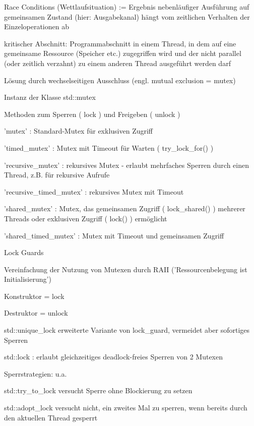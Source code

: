 \documentclass[10pt]{article}
\begin{document}
\begin{itemize*}
  \item Race Conditions (Wettlaufsituation) := Ergebnis nebenläufiger Ausführung auf gemeinsamen Zustand (hier: Ausgabekanal) hängt vom zeitlichen Verhalten der Einzeloperationen ab
  \item kritischer Abschnitt: Programmabschnitt in einem Thread, in dem auf eine gemeinsame Ressource (Speicher etc.) zugegriffen wird und der nicht parallel (oder zeitlich verzahnt) zu einem anderen Thread ausgeführt werden darf
  \item Lösung durch wechselseitigen Ausschluss (engl. mutual exclusion = mutex)
  \begin{itemize*}
    \item Instanz der Klasse std::mutex
    \item Methoden zum Sperren ( lock ) und Freigeben ( unlock )
    \item 'mutex' : Standard-Mutex für exklusiven Zugriff
    \item 'timed\_mutex' : Mutex mit Timeout für Warten ( try\_lock\_for() )
    \item 'recursive\_mutex' : rekursives Mutex - erlaubt mehrfaches Sperren durch einen Thread, z.B. für rekursive Aufrufe
    \item 'recursive\_timed\_mutex' : rekursives Mutex mit Timeout
    \item 'shared\_mutex' : Mutex, das gemeinsamen Zugriff ( lock\_shared() ) mehrerer Threads oder exklusiven Zugriff ( lock() ) ermöglicht
    \item 'shared\_timed\_mutex' : Mutex mit Timeout und gemeinsamen Zugriff
  \end{itemize*}
  \item Lock Guards
  \begin{itemize*}
    \item Vereinfachung der Nutzung von Mutexen durch RAII ('Ressourcenbelegung ist Initialisierung')
    \item Konstruktor = lock
    \item Destruktor = unlock
    \item std::unique\_lock erweiterte Variante von lock\_guard, vermeidet aber sofortiges Sperren
    \item std::lock : erlaubt gleichzeitiges deadlock-freies Sperren von 2 Mutexen
    \item Sperrstrategien: u.a.
    \begin{itemize*}
      \item std::try\_to\_lock versucht Sperre ohne Blockierung zu setzen
      \item std::adopt\_lock versucht nicht, ein zweites Mal zu sperren, wenn bereits durch den aktuellen Thread gesperrt
    \end{itemize*}
  \end{itemize*}
\end{itemize*}
\end{document}
